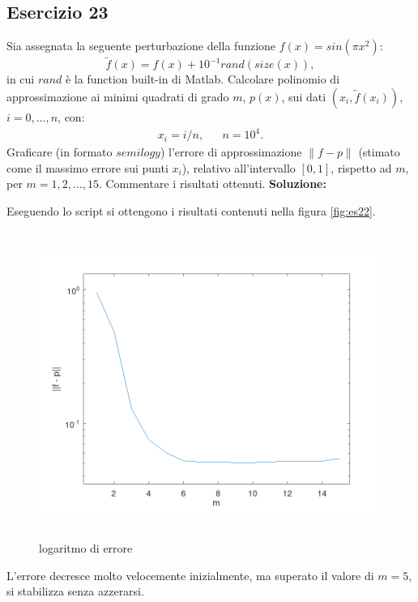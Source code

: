 \subsection{Esercizio 23}
Sia assegnata la seguente perturbazione della funzione $f(x) = sin(\pi x^2)$:
\[
    \tilde{f}(x) = f(x) + 10^{-1} rand(size(x)),
\]
in cui $rand$ è la function built-in di Matlab. Calcolare polinomio di approssimazione ai minimi
quadrati di grado $m$, $p(x)$, sui dati $(x_i, \tilde{f}(x_i))$, $i = 0, \dots, n$, con:
\begin{eqnarray*}
    x_i = i/n, & & n = 10^4.
\end{eqnarray*}
Graficare (in formato $semilogy$) l'errore di approssimazione $\|f - p\|$ (stimato come il massimo
errore sui punti $x_i$), relativo all'intervallo $[0, 1]$, rispetto ad $m$, per $m = 1, 2, \dots, 15$.
Commentare i risultati ottenuti.
\newline \textbf{Soluzione:}

Eseguendo lo script  si ottengono i risultati contenuti nella figura \ref{fig:es22}.
\begin{figure}[!ht]
    \centering
    \includegraphics[width=16cm,height=10cm,keepaspectratio]{capitolo4/es23_figure.png}
    \caption{logaritmo di errore}
    \label{fig:es23}
\end{figure}
\FloatBarrier
L'errore decresce molto velocemente inizialmente, ma superato il valore di $m = 5$, si stabilizza
senza azzerarsi.
